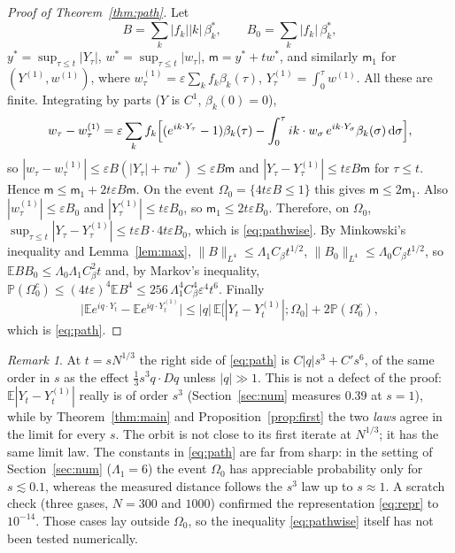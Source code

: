 \documentclass[11pt]{article}
\newcommand{\dd}{\mathrm{d}}
\newcommand{\E}{\mathbb{E}}
\newcommand{\PP}{\mathbb{P}}
\newcommand{\eps}{\varepsilon}
\theoremstyle{remark}
\newtheorem{remark}[theorem]{Remark}
\begin{document}
\begin{proof}[Proof of Theorem~\ref{thm:path}]
Let
\begin{equation}
  B=\sum_k|f_k||k|\,\beta_k^*,\qquad B_0=\sum_k|f_k|\,\beta_k^* ,
  \label{eq:BB0}
\end{equation}
$y^*=\sup_{\tau\le t}|Y_\tau|$, $w^*=\sup_{\tau\le t}|w_\tau|$,
$\mathsf m=y^*+tw^*$, and similarly $\mathsf m_1$ for
$(Y^{(1)},w^{(1)})$, where
$w^{(1)}_\tau=\eps\sum_kf_k\beta_k(\tau)$,
$Y^{(1)}_\tau=\int_0^\tau w^{(1)}$. All these are finite. Integrating by
parts ($Y$ is $C^1$, $\beta_k(0)=0$),
\[
  w_\tau-w^{(1)}_\tau=\eps\sum_kf_k\Bigl[(e^{ik\cdot Y_\tau}-1)\beta_k(\tau)
  -\int_0^\tau ik\cdot w_\sigma\,e^{ik\cdot Y_\sigma}\beta_k(\sigma)\,
  \dd\sigma\Bigr],
\]
so $|w_\tau-w^{(1)}_\tau|\le\eps B(|Y_\tau|+\tau w^*)\le\eps B\mathsf m$ and
$|Y_\tau-Y^{(1)}_\tau|\le t\eps B\mathsf m$ for $\tau\le t$. Hence
$\mathsf m\le\mathsf m_1+2t\eps B\mathsf m$. On the event
$\Omega_0=\{4t\eps B\le1\}$ this gives $\mathsf m\le2\mathsf m_1$. Also
$|w^{(1)}_\tau|\le\eps B_0$ and $|Y^{(1)}_\tau|\le t\eps B_0$, so
$\mathsf m_1\le2t\eps B_0$. Therefore, on $\Omega_0$,
$\sup_{\tau\le t}|Y_\tau-Y^{(1)}_\tau|\le t\eps B\cdot4t\eps B_0$, which is
\eqref{eq:pathwise}. By Minkowski's inequality and Lemma~\ref{lem:max},
$\|B\|_{L^4}\le\Lambda_1C_\beta t^{1/2}$,
$\|B_0\|_{L^4}\le\Lambda_0C_\beta t^{1/2}$, so
$\E BB_0\le\Lambda_0\Lambda_1C_\beta^2t$ and, by Markov's inequality,
$\PP(\Omega_0^c)\le(4t\eps)^4\E B^4\le256\,\Lambda_1^4C_\beta^4\eps^4t^6$.
Finally
\[
  \bigl|\E e^{iq\cdot Y_t}-\E e^{iq\cdot Y^{(1)}_t}\bigr|
  \le|q|\,\E\bigl[|Y_t-Y^{(1)}_t|;\Omega_0\bigr]+2\PP(\Omega_0^c),
\]
which is \eqref{eq:path}.
\end{proof}

\begin{remark}
At $t=sN^{1/3}$ the right side of \eqref{eq:path} is $C|q|s^3+C's^6$, of
the same order in $s$ as the effect $\frac13s^3q\cdot Dq$ unless $|q|\gg1$.
This is not a defect of the proof: $\E|Y_t-Y^{(1)}_t|$ really is of order
$s^3$ (Section~\ref{sec:num} measures $0.39$ at $s=1$), while by
Theorem~\ref{thm:main} and Proposition~\ref{prop:first} the two
\emph{laws} agree in the limit for every $s$. The orbit is not close to its
first iterate at $N^{1/3}$; it has the same limit law. The constants in
\eqref{eq:path} are far from sharp: in the setting of
Section~\ref{sec:num} ($\Lambda_1=6$) the event $\Omega_0$ has appreciable
probability only for $s\lesssim0.1$, whereas the measured distance follows
the $s^3$ law up to $s\approx1$. A scratch check (three gases, $N=300$ and
$1000$) confirmed the representation \eqref{eq:repr} to $10^{-14}$. Those
cases lay outside $\Omega_0$, so the inequality \eqref{eq:pathwise} itself
has not been tested numerically.
\end{remark}
\end{document}
